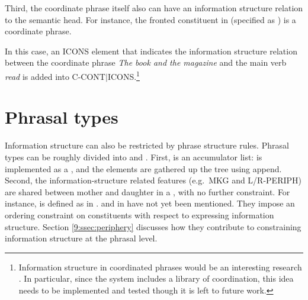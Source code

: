 \noindent Third, the coordinate phrase itself also can have an
information structure relation to the semantic head. For instance, the
fronted constituent in  (specified as
) is a coordinate phrase.  





\noindent In this case, an ICONS
element that indicates the information structure relation between the
coordinate phrase \textit{The book and the magazine} and the main verb
\textit{read} is added into C-CONT{$\mid$}ICONS.\footnote{Information
  structure in coordinated phrases would be an interesting research
  . In particular, since the 
  \lingo {} system includes a
  library of coordination, this idea needs to be implemented and
  tested though it is left to future work.}



\section{Phrasal types}
\label{10:sec:monoclausal}


Information structure can also be restricted by phrase structure
rules.  Phrasal types can be roughly divided into 
and . First,  is an accumulator list:
 is implemented as a , and the elements are
gathered up the tree using  append. Second, the
information-structure related features (e.g.\ MKG and
L/R-PERIPH) are shared between mother and daughter in a
, with no further
constraint. For instance, 
is defined as in .  and 
in  have not yet been mentioned. They impose an
ordering constraint on constituents with respect to expressing
information structure. Section \ref{9:ssec:periphery} discusses how
they contribute to constraining information structure at the phrasal
level.


